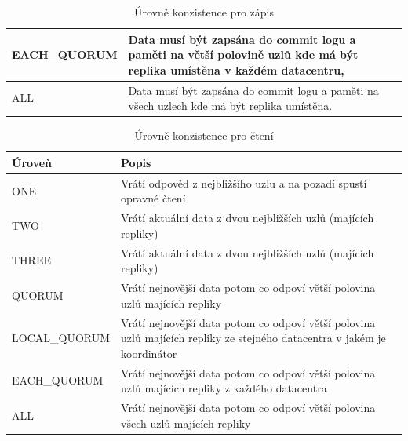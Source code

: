 \begin{table}
\begin{tabularx}{\textwidth}{ |l|X| }
    EACH\_QUORUM & Data musí být zapsána do commit logu a paměti na větší polovině uzlů kde má být replika umístěna v každém datacentru,                                                                                                                                                                  \\ \hline
    ALL          & Data musí být zapsána do commit logu a paměti na všech uzlech kde má být replika umístěna.                                                                                                                                                                                             \\ \hline
    \end{tabularx}
    \caption {Úrovně konzistence pro zápis}
\label{casawrites}

\end{table}


\begin{table}[!h]
\begin{tabularx}{\textwidth}{ |l|X| }

    \hline
    Úroveň       & Popis                                                                                                                    \\ \hline
    ONE          & Vrátí odpověd z nejbližšího uzlu a na pozadí spustí opravné čtení                                                        \\ \hline
    TWO          & Vrátí aktuální data z dvou nejbližších uzlů (majících repliky)                                                           \\ \hline
    THREE        & Vrátí aktuální data z dvou nejbližších uzlů (majících repliky)                                                           \\ \hline
    QUORUM       & Vrátí nejnovější data potom co odpoví větší polovina uzlů majících repliky                                               \\ \hline
    LOCAL\_QUORUM & Vrátí nejnovější data potom co odpoví větší polovina uzlů majících repliky ze stejného datacentra v jakém je koordinátor \\ \hline
    EACH\_QUORUM & Vrátí nejnovější data potom co odpoví větší polovina uzlů majících repliky z každého datacentra                          \\ \hline
    ALL          & Vrátí nejnovější data potom co odpoví větší polovina všech uzlů majících repliky                                         \\ \hline
    \end{tabularx}
    \caption {Úrovně konzistence pro čtení}
\label{casareads}

\end{table}



